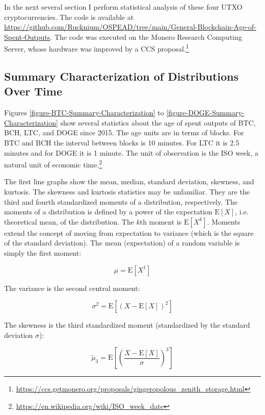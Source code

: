 \documentclass[english]{article}
\begin{document}
In the next several section I perform statistical analysis of these
four UTXO cryptocurrencies. The code is available at \href{https://github.com/Rucknium/OSPEAD/tree/main/General-Blockchain-Age-of-Spent-Outputs}{https://github.com/Rucknium/OSPEAD/tree/main/General-Blockchain-Age-of-Spent-Outputs}.
The code was executed on the Monero Research Computing Server, whose
hardware was improved by a CCS proposal.\footnote{\href{https://ccs.getmonero.org/proposals/gingeropolous_zenith_storage.html}{https://ccs.getmonero.org/proposals/gingeropolous\_zenith\_storage.html}}

\subsection{Summary Characterization of Distributions Over Time}

Figures \ref{figure-BTC-Summary-Characterization} to \ref{figure-DOGE-Summary-Characterization}
show several statistics about the age of spent outputs of BTC, BCH,
LTC, and DOGE since 2015. The age units are in terms of blocks. For
BTC and BCH the interval between blocks is 10 minutes. For LTC it
is 2.5 minutes and for DOGE it is 1 minute. The unit of observation
is the ISO week, a natural unit of economic time.\footnote{\href{https://en.wikipedia.org/wiki/ISO_week_date}{https://en.wikipedia.org/wiki/ISO\_week\_date}}

The first line graphs show the mean, median, standard deviation, skewness,
and kurtosis. The skewness and kurtosis statistics may be unfamiliar.
They are the third and fourth standardized moments of a distribution,
respectively. The moments of a distribution is defined by a power
of the expectation $\mathrm{E}[X]$, i.e. theoretical mean, of the
distribution. The $k$th moment is $\mathrm{E}[X^{k}]$. Moments extend
the concept of moving from expectation to variance (which is the square
of the standard deviation). The mean (expectation) of a random variable
is simply the first moment:

\[
\mu=\mathrm{E}[X^{1}]
\]

The variance is the second central moment:

\[
\sigma^{2}=\mathrm{E}\left[\left(X-\mathrm{E}[X]\right)^{2}\right]
\]

The skewness is the third standardized moment (standardized by the
standard deviation $\sigma$):

\[
\tilde{\mu}_{3}=\mathrm{E}\left[\left(\dfrac{X-\mathrm{E}[X]}{\sigma}\right)^{3}\right]
\]
\end{document}
